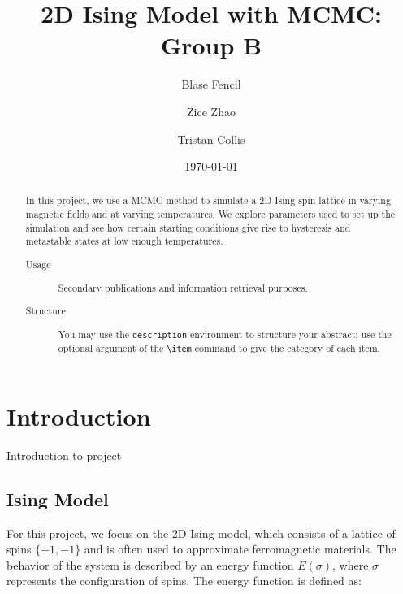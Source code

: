 \documentclass[%
 reprint,
 amsmath,amssymb,
 aps,
]{revtex4-2}
\begin{document}

\title{2D Ising Model with MCMC:\\Group B}%

\author{Blase Fencil}
\author{Zice Zhao}%
\author{Tristan Collis}

\date{\today}%

\begin{abstract}
In this project, we use a MCMC method to simulate a 2D Ising spin lattice in varying 
magnetic fields and at varying temperatures. We explore parameters used to set up the 
simulation and see how certain starting conditions give rise to hysteresis and metastable 
states at low enough temperatures.
\begin{description}
\item[Usage]
Secondary publications and information retrieval purposes.
\item[Structure]
You may use the \texttt{description} environment to structure your abstract;
use the optional argument of the \verb+\item+ command to give the category of each item. 
\end{description}
\end{abstract}

\maketitle


\section{\label{sec:level1}Introduction}

Introduction to project 

\subsection{\label{sec:level2}Ising Model}

For this project, we focus on the 2D Ising model, which consists of a lattice of spins $\{+1, -1\}$ and is often used to approximate ferromagnetic materials. The behavior of the system is described by an energy function $E(\sigma)$, where $\sigma$ represents the configuration of spins. The energy function is defined as:
\end{document}
